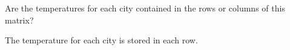 Are the temperatures for each city contained in the rows or columns of this matrix?

\begin{solution}
The temperature for each city is stored in each row.
\end{solution}